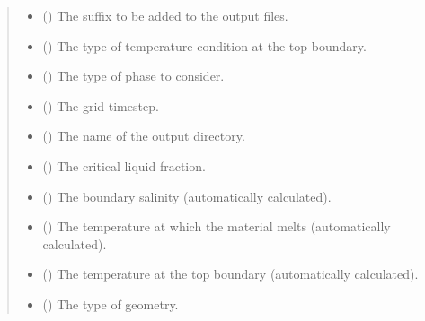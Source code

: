 \documentclass[a4paper,11pt,english,openany]{sphinxmanual}
\begin{document}
\begin{fulllineitems}
\begin{quote}
\begin{description}
\begin{itemize}
\item {} 
\sphinxAtStartPar
{} () \textendash{} The suffix to be added to the output files.

\item {} 
\sphinxAtStartPar
{} () \textendash{} The type of temperature condition at the top boundary.

\item {} 
\sphinxAtStartPar
{} () \textendash{} The type of phase to consider.

\item {} 
\sphinxAtStartPar
{} () \textendash{} The grid timestep.

\item {} 
\sphinxAtStartPar
{} () \textendash{} The name of the output directory.

\item {} 
\sphinxAtStartPar
{} () \textendash{} The critical liquid fraction.

\item {} 
\sphinxAtStartPar
{} () \textendash{} The boundary salinity (automatically calculated).

\item {} 
\sphinxAtStartPar
{} () \textendash{} The temperature at which the material melts (automatically calculated).

\item {} 
\sphinxAtStartPar
{} () \textendash{} The temperature at the top boundary (automatically calculated).

\item {} 
\sphinxAtStartPar
{} () \textendash{} The type of geometry.


\end{itemize}
\end{description}
\end{quote}
\end{fulllineitems}
\end{document}

